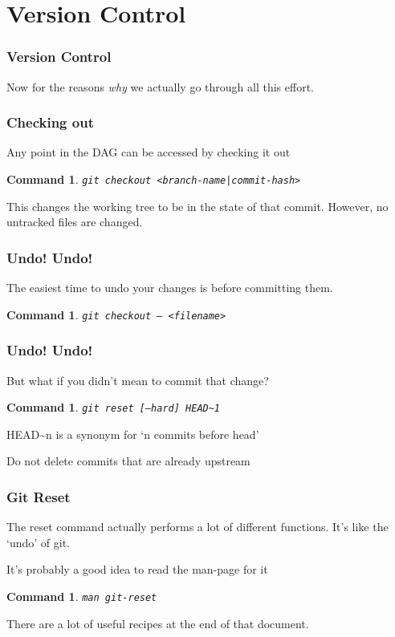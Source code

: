 \documentclass{beamer}
\newtheorem{command}[theorem]{Command}
\begin{document}
\section{Version Control}

\begin{frame}
    \frametitle{Version Control}
    Now for the reasons \emph{why} we actually go through all this effort.
\end{frame}

\begin{frame}
    \frametitle{Checking out}
    Any point in the DAG can be accessed by checking it out
    \begin{command}
        \texttt{git checkout <branch-name|commit-hash>}
    \end{command}
    This changes the working tree to be in the state of that commit. However, no untracked files are changed.
\end{frame}

\begin{frame}
    \frametitle{Undo! Undo!}
    The easiest time to undo your changes is before committing them.
    \begin{command}
        \texttt{git checkout -- <filename>}
    \end{command}
\end{frame}



\begin{frame}
    \frametitle{Undo! Undo!}
    But what if you didn't mean to commit that change?
    \begin{command}
        \texttt{git reset [--hard] HEAD\~{}1}
    \end{command}
    \pause
    HEAD\~{}n is a synonym for `n commits before head'

    \pause
    \alert{Do not delete commits that are already upstream}
\end{frame}

\begin{frame}
    \frametitle{Git Reset}
    The reset command actually performs a lot of different functions. It's like the `undo' of git.

    It's probably a good idea to read the man-page for it
    \begin{command}
        \texttt{man git-reset}
    \end{command}

    There are a lot of useful recipes at the end of that document.
\end{frame}
\end{document}
